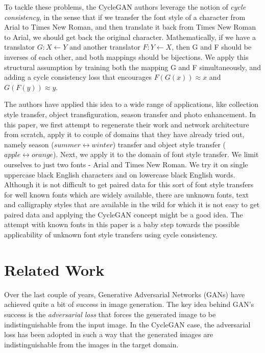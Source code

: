\documentclass[10pt,twocolumn,letterpaper]{article}
\begin{document}
To tackle these problems, the CycleGAN \cite{cyclegan} authors leverage the notion of \textit{cycle consistency}, in the sense that if we transfer the font style of a character from Arial to Times New Roman, and then translate it back from Times New Roman to Arial, we should get back the original character. Mathematically, if we have a translator $G : X \leftarrow Y$ and another translator $F: Y \leftarrow X$, then G and F should be inverses of each other, and both mappings should be bijections. We apply this structural assumption by training both the mapping G and F simultaneously, and adding a cycle consistency loss \cite{cycle2} that encourages $F(G(x)) \approx x$ and $G(F(y)) \approx y$.

The authors \cite{cyclegan} have applied this idea to a wide range of
applications, like collection style transfer, object transfiguration, season
transfer and photo enhancement. In this paper, we first attempt to regenerate
their work and network architecture from scratch, apply it to couple of domains 
that they have already tried out, namely season ($summer \leftrightarrow winter$) 
transfer and object style transfer ($apple \leftrightarrow orange$). Next, we apply 
it to the domain of font style transfer. We limit ourselves to just two fonts - Arial and 
Times New Roman. We try it on single uppercase black English characters and on 
lowercase black English words. Although it is not difficult to get paired data for this 
sort of font style transfers for well known fonts which are widely available, there are 
unknown fonts, text and calligraphy styles that are available in the wild for which it is 
not easy to get paired data and applying the CycleGAN concept might be a good idea. 
The attempt with known fonts in this paper is a baby step towards the possible 
applicability of unknown font style transfers using cycle consistency.

\section{Related Work}
Over the last couple of years, Generative Adversarial Networks (GANs) \cite{gan1, gan2} have achieved
quite a bit of success in image generation. The key idea behind GAN's success is the \textit{adversarial 
loss} that forces the generated image to be indistinguishable from the input image. In the CycleGAN case,
the adversarial loss has been adopted in such a way that the generated images are indistinguishable from 
the images in the target domain.
\end{document}
